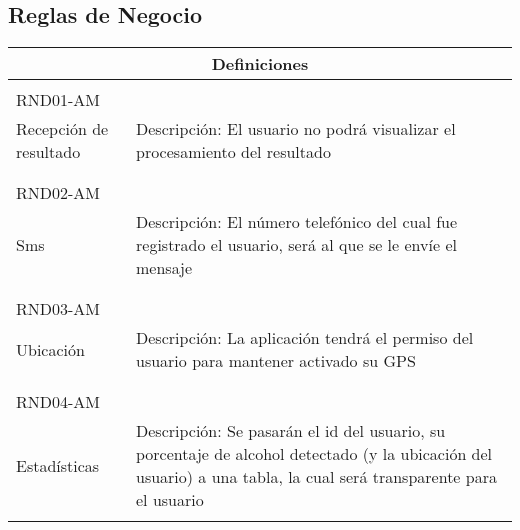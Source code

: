 \subsection{Reglas de Negocio} 

  
  \begin{center}
   \begin{tabular}[b]{| p{5.5cm} | p{7cm} |}
     \hline
     \multicolumn{2}{|c|}{Definiciones} \\ \hline
    \\ RND01-AM \\ Recepción de resultado & Descripción: El usuario no podrá visualizar el procesamiento del resultado \\ \\ \hline
    \\ RND02-AM \\ Sms & Descripción: El número telefónico del cual fue registrado el usuario, será al que se le envíe el mensaje \\ \\ \hline
    \\ RND03-AM \\ Ubicación & Descripción: La aplicación tendrá el permiso del usuario para mantener activado su GPS \\ \\ \hline
    \\ RND04-AM \\ Estadísticas & Descripción: Se pasarán el id del usuario, su porcentaje de alcohol detectado (y la ubicación del usuario) a una tabla, la cual será transparente para el usuario \\ \\ \hline
   \end{tabular}
 \end{center}
   

